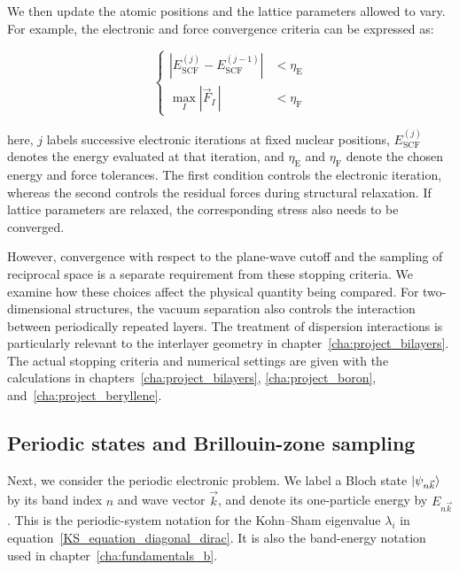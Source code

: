 We then update the atomic positions and the lattice parameters allowed to vary.
For example, the electronic and force convergence criteria can be expressed as:

\begin{equation}
\left\{\begin{aligned}
    \left|E_\mathrm{SCF}^{(j)}-E_\mathrm{SCF}^{(j-1)}\right|
    &<\eta_\mathrm{E} \\
    \max_I|\vec{F}_I\,|&<\eta_\mathrm{F}
\end{aligned}\right.
\label{electronic_and_force_convergence}
\end{equation}

here, $j$ labels successive electronic iterations at fixed nuclear positions,
$E_\mathrm{SCF}^{(j)}$ denotes the energy evaluated at that iteration,
and $\eta_\mathrm{E}$ and $\eta_\mathrm{F}$ denote the chosen energy and force tolerances.
The first condition controls the electronic iteration,
whereas the second controls the residual forces during structural relaxation.
If lattice parameters are relaxed, the corresponding stress also needs to be converged.

However, convergence with respect to the plane-wave cutoff and the sampling of reciprocal space is a separate requirement from these stopping criteria.
We examine how these choices affect the physical quantity being compared.
For two-dimensional structures, the vacuum separation also controls the interaction between periodically repeated layers.
The treatment of dispersion interactions is particularly relevant to the interlayer geometry in chapter~\ref{cha:project_bilayers}.
The actual stopping criteria and numerical settings are given with the calculations in chapters~\ref{cha:project_bilayers}, \ref{cha:project_boron}, and~\ref{cha:project_beryllene}.

\FloatBarrier
\subsection{Periodic states and Brillouin-zone sampling}
\label{subsec:method_kpoints}

Next, we consider the periodic electronic problem.
We label a Bloch state $\ket{\psi_{n\vec{k}}}$ by its band index $n$ and wave vector $\vec{k}$,
and denote its one-particle energy by $E_{n\vec{k}}$.
This is the periodic-system notation for the Kohn--Sham eigenvalue $\lambda_i$ in equation~\eqref{KS_equation_diagonal_dirac}.
It is also the band-energy notation used in chapter~\ref{cha:fundamentals_b}.

